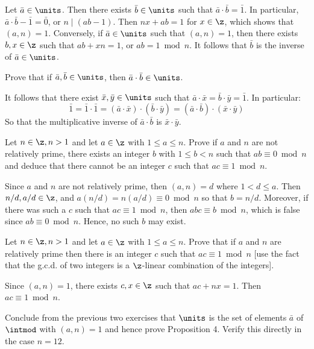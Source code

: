 \begin{problems}
\begin{sol}
        Let $\bar a \in \units$. Then there exists $\bar b \in \units$ such that $\bar a \cdot \bar b = \bar 1$. In particular, $\bar a \cdot \bar b - \bar 1 = \bar 0$, or $n \mid (ab - 1)$. Then $nx + ab = 1$ for $x \in \z$, which shows that $(a, n) = 1$. Conversely, if $\bar a \in \units$ such that $(a, n) = 1$, then there exists $b, x \in \z$ such that $ab + xn = 1$, or $ab = 1 \bmod n$. It follows that $\bar b$ is the inverse of $\bar a \in \units$.
    \end{sol}
    \item Prove that if $\bar a, \bar b \in \units$, then $\bar a \cdot \bar b \in \units$.
    \begin{sol}
        It follows that there exist $\bar x, \bar y \in \units$ such that $\bar a \cdot \bar x = \bar b \cdot \bar y = \bar 1$. In particular:
        $$\bar 1 = \bar 1 \cdot \bar 1 = (\bar a \cdot \bar x)\cdot(\bar b \cdot \bar y) = (\bar a \cdot \bar b) \cdot (\bar x \cdot \bar y)$$
        So that the multiplicative inverse of $\bar a \cdot \bar b$ is $\bar x \cdot \bar y$.
    \end{sol}
    \item Let $n \in \z, n > 1$ and let $a \in \z$ with $1 \leq a \leq n$. Prove if $a$ and $n$ are not relatively prime, there exists an integer $b$ with $1 \leq b < n$ such that $ab \equiv 0 \bmod n$ and deduce that there cannot be an integer $c$ such that $ac \equiv 1 \bmod n$.
    \begin{sol}
        Since $a$ and $n$ are not relatively prime, then $(a, n) = d$ where $1 < d \leq a$. Then $n/d, a/d \in \z$, and $a(n/d) = n(a/d) \equiv 0 \bmod n$ so that $b = n/d$. Moreover, if there was such a $c$ such that $ac \equiv 1 \bmod n$, then $abc \equiv b \bmod n$, which is false since $ab \equiv 0 \bmod n$. Hence, no such $b$ may exist.
    \end{sol}
    \item Let $n \in \z, n > 1$ and let $a \in \z$ with $1 \leq a \leq n$. Prove that if $a$ and $n$ are relatively prime then there is an integer $c$ such that $ac \equiv 1 \bmod n$ [use the fact that the g.c.d. of two integers is a $\z$-linear combination of the integers].
    \begin{sol}
        Since $(a, n) = 1$, there exists $c, x \in \z$ such that $ac + nx = 1$. Then $ac \equiv 1 \bmod n$.
    \end{sol}
    \item Conclude from the previous two exercises that $\units$ is the set of elements $\bar a$ of $\intmod$ with $(a, n) = 1$ and hence prove Proposition 4. Verify this directly in the case $n = 12$.

\end{problems}
